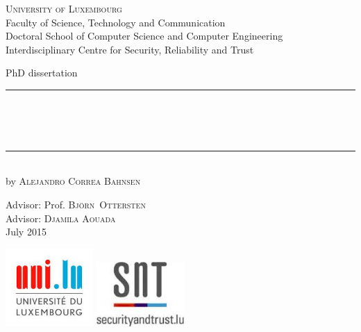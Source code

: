 
\begin{titlepage}
	\begin{addmargin}[-1cm]{-3cm}
    \begin{center}
        \large
        {\Large \textsc{University of Luxembourg}}\\[1ex]
        Faculty of Science, Technology and Communication\\
        Doctoral School of Computer Science and Computer Engineering\\
				Interdisciplinary Centre for Security, Reliability and Trust\\

        \vfill

        PhD dissertation\\ \vskip1cm
        \rule{15cm}{0.4pt}\\ \bigskip
        \begingroup
            \Large
            \color{Maroon} \\ 
						\bigskip
        \endgroup
        \\
        \bigskip
        \rule{15cm}{0.4pt}\\ \vskip1cm
        by \textsc{Alejandro Correa Bahnsen}

        \vfill

        \hfill Advisor: Prof. \textsc{Bj\"orn~Ottersten}\\
				\hfill Advisor: \textsc{Djamila Aouada}\\
        \hfill July 2015
			  \vspace{1.5cm}
    \end{center}
    \vspace{-3.5cm}\includegraphics[width=0.25\textwidth]{figures/logo_unilu}
    \includegraphics[width=0.25\textwidth]{figures/logo_snt}
  \end{addmargin}
\end{titlepage}
